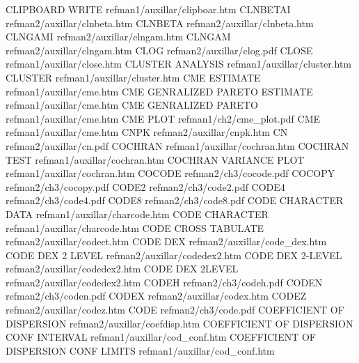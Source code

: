 CLIPBOARD WRITE                         refman1/auxillar/clipboar.htm
CLNBETAI                                refman2/auxillar/clnbeta.htm
CLNBETA                                 refman2/auxillar/clnbeta.htm
CLNGAMI                                 refman2/auxillar/clngam.htm
CLNGAM                                  refman2/auxillar/clngam.htm
CLOG                                    refman2/auxillar/clog.pdf
CLOSE                                   refman1/auxillar/close.htm
CLUSTER ANALYSIS                        refman1/auxillar/cluster.htm
CLUSTER                                 refman1/auxillar/cluster.htm
CME ESTIMATE                            refman1/auxillar/cme.htm
CME GENRALIZED PARETO ESTIMATE          refman1/auxillar/cme.htm
CME GENRALIZED PARETO                   refman1/auxillar/cme.htm
CME PLOT                                refman1/ch2/cme_plot.pdf
CME                                     refman1/auxillar/cme.htm
CNPK                                    refman2/auxillar/cnpk.htm
CN                                      refman2/auxillar/cn.pdf
COCHRAN                                 refman1/auxillar/cochran.htm
COCHRAN TEST                            refman1/auxillar/cochran.htm
COCHRAN VARIANCE PLOT                   refman1/auxillar/cochran.htm
COCODE                                  refman2/ch3/cocode.pdf
COCOPY                                  refman2/ch3/cocopy.pdf
CODE2                                   refman2/ch3/code2.pdf
CODE4                                   refman2/ch3/code4.pdf
CODE8                                   refman2/ch3/code8.pdf
CODE CHARACTER DATA                     refman1/auxillar/charcode.htm
CODE CHARACTER                          refman1/auxillar/charcode.htm
CODE CROSS TABULATE                     refman2/auxillar/codect.htm
CODE DEX                                refman2/auxillar/code_dex.htm
CODE DEX 2 LEVEL                        refman2/auxillar/codedex2.htm
CODE DEX 2-LEVEL                        refman2/auxillar/codedex2.htm
CODE DEX 2LEVEL                         refman2/auxillar/codedex2.htm
CODEH                                   refman2/ch3/codeh.pdf
CODEN                                   refman2/ch3/coden.pdf
CODEX                                   refman2/auxillar/codex.htm
CODEZ                                   refman2/auxillar/codez.htm
CODE                                    refman2/ch3/code.pdf
COEFFICIENT OF DISPERSION               refman2/auxillar/coefdisp.htm
COEFFICIENT OF DISPERSION CONF INTERVAL refman1/auxillar/cod_conf.htm
COEFFICIENT OF DISPERSION CONF LIMITS   refman1/auxillar/cod_conf.htm
